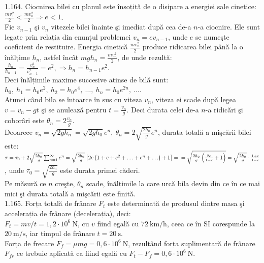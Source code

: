 1.164. Ciocnirea bilei cu planul este însoțită de o disipare a energiei sale cinetice:\\ $\frac{m v_{1}^{2}}{2}<\frac{m v_{0}^{2}}{2} \Rightarrow e<1$.\\ Fie $v_{n-1}$ şi $v_{n}$ vitezele bilei înainte şi imediat după cea de-a $n$-a ciocnire. Ele sunt legate prin relația din enunțul problemei $v_{n}=e v_{n-1}$, unde $e$ se numeşte coeficient de restituire. Energia cinetică $\frac{m v_{n}^{2}}{2}$ produce ridicarea bilei până la o înălțime $h_{n}$, astfel încât $m g h_{n}=\frac{m v_{n}^{2}}{2}$, de unde rezultă:\\ $\frac{h_{n}}{h_{n-1}}=\frac{v_{n}^{2}}{v_{n-1}^{2}}=e^{2}, \Rightarrow h_{n}=h_{n-1} e^{2}$.\\ Deci înălțimile maxime succesive atinse de bilă sunt:\\ $h_{0},\ h_{1}=h_{0} e^{2},\ h_{2}=h_{0} e^{4},\ \ldots,\ h_{n}=h_{0} e^{2 n},\ \ldots$.\\ Atunci când bila se întoarce în sus cu viteza $v_{n}$, viteza ei scade după legea $v=v_{n}-g t$ şi se anulează pentru $t=\frac{v_{n}}{g}$. Deci durata celei de-a $n$-a ridicări şi coborâri este $\theta_{n}=2 \frac{v_{n}}{g}$.\\ Deoarece $v_{n}=\sqrt{2 g h_{n}}=\sqrt{2 g h_{0}} e^{n},\ \theta_{n}=2 \sqrt{\frac{2 h_{0}}{g}} e^{n}$, durata totală a mişcării bilei este:\\ $\tau=\tau_{0}+2 \sqrt{\frac{2 h_{0}}{g}} \sum_{n=1}^{\infty} e^{n}=\sqrt{\frac{2 h_{0}}{g}}\left[2 e\left(1+e+e^{2}+\ldots+e^{n}+\ldots\right)+1\right]=\\ =\sqrt{\frac{2 h_{0}}{g}\left(\frac{2 e}{1-e}+1\right)}=\sqrt{\frac{2 h_{0}}{g}} \cdot \frac{1+e}{1-e}$, unde $\tau_{0}=\sqrt{\frac{2 h_{0}}{g}}$ este durata primei căderi.\\ Pe măsură ce $n$ creşte, $\theta_{n}$ scade, înălțimile la care urcă bila devin din ce în ce mai mici şi durata totală a mişcării este finită.\\

1.165. Forța totală de frânare $F_{t}$ este determinată de produsul dintre masa şi accelerația de frânare (decelerația), deci:\\ $F_{t}=m v / t=1,2 \cdot 10^{6} \mathrm{~N}$, cu $v$ fiind egală cu $72 \mathrm{~km} / \mathrm{h}$, ceea ce în SI corespunde la $20 \mathrm{~m} / \mathrm{s}$, iar timpul de frânare $t=20 \mathrm{~s}$.\\ Forța de frecare $F_{f}=\mu m g=0,6 \cdot 10^{6} \mathrm{~N}$, rezultând forța suplimentară de frânare $F_{f r}$ ce trebuie aplicată ca fiind egală cu $F_{t}-F_{f}=0,6 \cdot 10^{6} \mathrm{~N}$.\\


